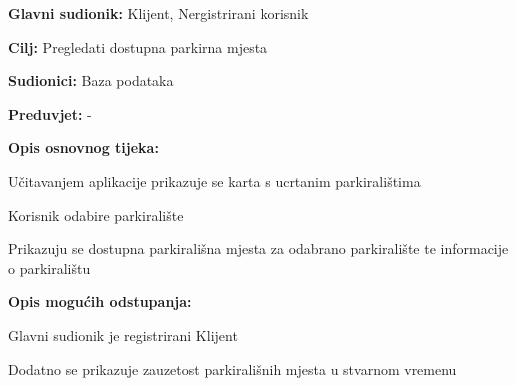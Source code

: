 					\noindent {}
					\begin{packed_item}
	
						\item \textbf{Glavni sudionik: }Klijent, Nergistrirani korisnik
						\item  \textbf{Cilj:} Pregledati dostupna parkirna mjesta
						\item  \textbf{Sudionici:} Baza podataka
						\item  \textbf{Preduvjet:} -
						\item  \textbf{Opis osnovnog tijeka:}
						
						\item[] \begin{packed_enum}
	
							\item Učitavanjem aplikacije prikazuje se karta s ucrtanim parkiralištima
							\item Korisnik odabire parkiralište
							\item Prikazuju se dostupna parkirališna mjesta za odabrano parkiralište te informacije o parkiralištu
							
						\end{packed_enum}

                            \item  \textbf{Opis mogućih odstupanja:}
						
						\item[] \begin{packed_item}
	
							\item[3.a] Glavni sudionik je registrirani Klijent
							\item[] \begin{packed_enum}
								
								\item Dodatno se prikazuje zauzetost parkirališnih mjesta u stvarnom vremenu
								
								
							\end{packed_enum}
	
							
						\end{packed_item}	
					\end{packed_item}

